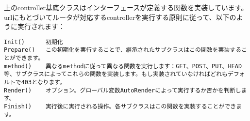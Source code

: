 上のcontroller基底クラスはインターフェースが定義する関数を実装しています。urlにもとづいてルータが対応するcontrollerを実行する原則に従って、以下のように実行されます：


\begin{lstlisting}[numbers=none]
Init()      初期化
Prepare()   この初期化を実行することで、継承されたサブクラスはこの関数を実装することができます。
method()    異なるmethodに従って異なる関数を実行します：GET、POST、PUT、HEAD等、サブクラスによってこれらの関数を実装します。もし実装されていなければどれもデフォルトで403となります。
Render()    オプション。グローバル変数AutoRenderによって実行するか否かを判断します。
Finish()    実行後に実行される操作。各サブクラスはこの関数を実装することができます。
\end{lstlisting}


